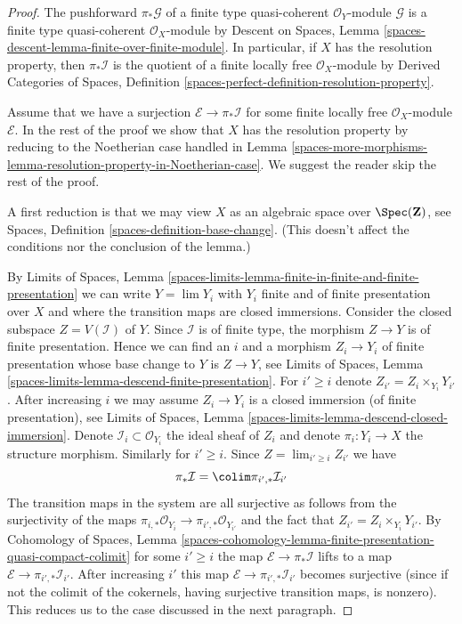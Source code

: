 \begin{proof}
The pushforward $\pi_*\mathcal{G}$ of a finite type
quasi-coherent $\mathcal{O}_Y$-module $\mathcal{G}$ is a finite
type quasi-coherent $\mathcal{O}_X$-module by
Descent on Spaces, Lemma
\ref{spaces-descent-lemma-finite-over-finite-module}.
In particular, if $X$ has the resolution property, then $\pi_*\mathcal{I}$
is the quotient of a finite locally free $\mathcal{O}_X$-module by
Derived Categories of Spaces, Definition
\ref{spaces-perfect-definition-resolution-property}.

\medskip\noindent
Assume that we have a surjection $\mathcal{E} \to \pi_*\mathcal{I}$
for some finite locally free $\mathcal{O}_X$-module $\mathcal{E}$.
In the rest of the proof we show that $X$ has the resolution property
by reducing to the Noetherian case handled in
Lemma \ref{spaces-more-morphisms-lemma-resolution-property-in-Noetherian-case}.
We suggest the reader skip the rest of the proof.

\medskip\noindent
A first reduction is that we may view $X$ as an algebraic space over
$\Spec(\mathbf{Z})$, see
Spaces, Definition \ref{spaces-definition-base-change}.
(This doesn't affect the conditions nor the conclusion of the lemma.)

\medskip\noindent
By Limits of Spaces, Lemma
\ref{spaces-limits-lemma-finite-in-finite-and-finite-presentation}
we can write $Y = \lim Y_i$ with $Y_i$ finite and of finite
presentation over $X$ and where the transition maps are closed
immersions. Consider the closed subspace $Z = V(\mathcal{I})$ of $Y$.
Since $\mathcal{I}$ is of finite type, the morphism $Z \to Y$ is of
finite presentation. Hence we can find an $i$ and a morphism
$Z_i \to Y_i$ of finite presentation whose base change to $Y$
is $Z \to Y$, see Limits of Spaces, Lemma
\ref{spaces-limits-lemma-descend-finite-presentation}.
For $i' \geq i$ denote $Z_{i'} = Z_i \times_{Y_i} Y_{i'}$.
After increasing $i$ we may assume $Z_i \to Y_i$ is a
closed immersion (of finite presentation), see Limits of Spaces, Lemma
\ref{spaces-limits-lemma-descend-closed-immersion}. Denote
$\mathcal{I}_i \subset \mathcal{O}_{Y_i}$ the ideal
sheaf of $Z_i$ and denote $\pi_i : Y_i \to X$ the structure morphism.
Similarly for $i' \geq i$. Since $Z = \lim_{i' \geq i} Z_{i'}$ we have
$$
\pi_*\mathcal{I} = \colim \pi_{i', *}\mathcal{I}_{i'}
$$
The transition maps in the system are all surjective
as follows from the surjectivity of the maps
$\pi_{i, *}\mathcal{O}_{Y_i} \to \pi_{i', *}\mathcal{O}_{Y_{i'}}$
and the fact that $Z_{i'} = Z_i \times_{Y_i} Y_{i'}$.
By Cohomology of Spaces, Lemma
\ref{spaces-cohomology-lemma-finite-presentation-quasi-compact-colimit}
for some $i' \geq i$ the map $\mathcal{E} \to \pi_*\mathcal{I}$
lifts to a map $\mathcal{E} \to \pi_{i', *}\mathcal{I}_{i'}$.
After increasing $i'$ this map
$\mathcal{E} \to \pi_{i', *}\mathcal{I}_{i'}$
becomes surjective (since if not the colimit of the cokernels,
having surjective transition maps, is nonzero).
This reduces us to the case discussed in the next paragraph.


\end{proof}
